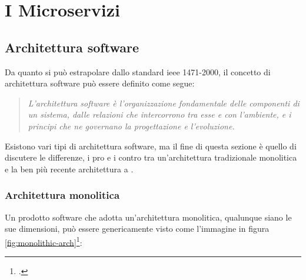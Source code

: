 
\chapter{I Microservizi}\label{cap:microservizi}



\section{Architettura software}

Da quanto si può estrapolare dallo standard \acrshort{ieee} 1471-2000, il concetto di architettura software può essere definito come segue:
\begin{quotation}
	\noindent \textit{L'architettura software è l'organizzazione fondamentale delle componenti di un sistema, dalle relazioni che intercorrono tra esse e con l'ambiente, e i principi che ne governano la progettazione e l'evoluzione.}
\end{quotation} 

Esistono vari tipi di architettura software, ma il fine di questa sezione è quello di discutere le differenze, i pro e i contro tra un'architettura tradizionale monolitica e la ben più recente architettura a .

\clearpage

\subsection{Architettura monolitica}
Un prodotto software che adotta un'architettura monolitica, qualunque siano le sue dimensioni, può essere genericamente visto come l'immagine in figura  \ref{fig:monolithic-arch}\footcite{site:monolithic-architecture}:

